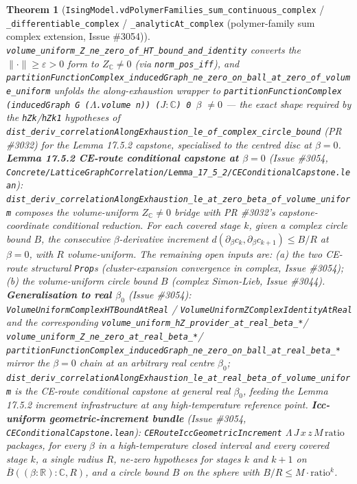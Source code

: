 \documentclass[a4paper,11pt]{article}
\newtheorem{theorem}{Theorem}
\begin{document}
\begin{theorem}[\texttt{IsingModel.vdPolymerFamilies\_sum\_continuous\_complex} /
\texttt{\_differentiable\_complex} / \texttt{\_analyticAt\_complex} (polymer-family sum
complex extension, Issue \#3054)]
\texttt{volume\_uniform\_Z\_ne\_zero\_of\_HT\_bound\_and\_identity} converts the
\(\|\cdot\|\ge\varepsilon>0\) form to \(Z_{\mathbb{C}}\ne0\) (via
\texttt{norm\_pos\_iff}), and
\texttt{partitionFunctionComplex\_inducedGraph\_ne\_zero\_on\_ball\_at\_zero\_of\_volume\_uniform}
unfolds the along-exhaustion wrapper to
\texttt{partitionFunctionComplex (inducedGraph G ($\Lambda$.volume n))
($J{:}\mathbb{C}$) 0 $\beta$} \(\ne0\) — the exact shape required by the
\texttt{hZk}/\texttt{hZk1} hypotheses of
\texttt{dist\_deriv\_correlationAlongExhaustion\_le\_of\_complex\_circle\_bound}
(PR \#3032) for the Lemma 17.5.2 capstone, specialised to the centred disc at
\(\beta=0\).
\textbf{Lemma 17.5.2 CE-route conditional capstone at \(\beta=0\)} (Issue
\#3054,
\texttt{Concrete/LatticeGraphCorrelation/Lemma\_17\_5\_2/CEConditionalCapstone.lean}):
\texttt{dist\_deriv\_correlationAlongExhaustion\_le\_at\_zero\_beta\_of\_volume\_uniform}
composes the volume-uniform \(Z_{\mathbb{C}}\ne0\) bridge with PR \#3032's
capstone-coordinate conditional reduction. For each covered stage \(k\), given
a complex circle bound \(B\), the consecutive \(\beta\)-derivative increment
\(d(\partial_\beta c_k,\partial_\beta c_{k+1})\le B/R\) at \(\beta=0\), with
\(R\) volume-uniform. The remaining open inputs are: (a) the two CE-route
structural \texttt{Prop}s (cluster-expansion convergence in complex,
Issue \#3054); (b) the volume-uniform circle bound \(B\) (complex Simon-Lieb,
Issue \#3044).
\textbf{Generalisation to real \(\beta_0\)} (Issue \#3054):
\texttt{VolumeUniformComplexHTBoundAtReal} /
\texttt{VolumeUniformZComplexIdentityAtReal} and the corresponding
\texttt{volume\_uniform\_hZ\_provider\_at\_real\_beta\_*}/
\texttt{volume\_uniform\_Z\_ne\_zero\_at\_real\_beta\_*}/
\texttt{partitionFunctionComplex\_inducedGraph\_ne\_zero\_on\_ball\_at\_real\_beta\_*}
mirror the \(\beta=0\) chain at an arbitrary real centre \(\beta_0\);
\texttt{dist\_deriv\_correlationAlongExhaustion\_le\_at\_real\_beta\_of\_volume\_uniform}
is the CE-route conditional capstone at general real \(\beta_0\), feeding the
Lemma 17.5.2 increment infrastructure at any high-temperature reference point.
\textbf{Icc-uniform geometric-increment bundle} (Issue \#3054,
\texttt{CEConditionalCapstone.lean}):
\texttt{CERouteIccGeometricIncrement} \(\Lambda\,J\,x\,z\,M\,\mathrm{ratio}\)
packages, for every \(\beta\) in a high-temperature closed interval and every
covered stage \(k\), a single radius \(R\), ne-zero hypotheses for stages \(k\)
and \(k+1\) on \(\overline{B}((\beta{:}\mathbb{R}){:}\mathbb{C}, R)\), and a
circle bound \(B\) on the sphere with \(B/R\le M\cdot\mathrm{ratio}^k\).

\end{theorem}
\end{document}
